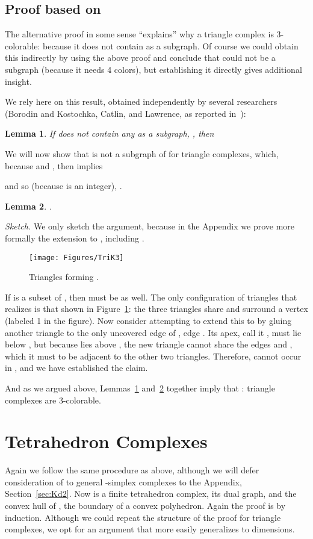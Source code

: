 \pdfoutput=1  \documentclass[]{article}
\newcommand{\ABox}{
\raisebox{3pt}{\framebox[6pt]{\rule{6pt}{0pt}}}
}
\newenvironment{proof}{{\bf Proof:}}{\hfill\ABox}
\newtheorem{lemma}{Lemma}
\newcommand{\lemlab}[1]{\label{lemma:#1}}
\newcommand{\figlab}[1]{\label{fig:#1}}
\newcommand{\lemref}[1]{\ref{lemma:#1}}
\newcommand{\secref}[1]{\ref{sec:#1}}
\newcommand{\figref}[1]{\ref{fig:#1}}
\begin{document}
\subsection{Proof based on }
The alternative proof in some sense ``explains'' why a triangle complex
is
3-colorable: because it does not contain  as a subgraph.
Of course we could obtain this indirectly by using the above proof and
conclude that  could not be a subgraph (because it needs 4
colors),
but establishing it directly gives additional insight.

We rely here on this result,
obtained independently by several researchers
(Borodin and Kostochka, Catlin, and Lawrence, as reported in~\cite{s-nubcn-02}):
\begin{lemma}
If  does not contain any  as a subgraph,
,
then 

\lemlab{Lawrence}
\end{lemma}
We will now show that  is not a subgraph of  for triangle
complexes,
which, because  and , then implies

and so (because  is an integer), .

\begin{lemma}
.
\lemlab{notK4}
\end{lemma}
\begin{proof}
\emph{Sketch.}
We only sketch the argument, because in the Appendix we prove
more formally the extension to , including .

\begin{figure}[htbp]
\centering
\texttt{[image: Figures/TriK3]}
\caption{Triangles forming .}
\figlab{TriK3}
\end{figure}
If  is a subset of , then  must be as well.
The only configuration of triangles that realizes  is that shown
in Figure~\figref{TriK3}: the three triangles share and surround a vertex (labeled
1 in the figure).  Now consider attempting to
extend this to  by gluing another triangle to the only uncovered
edge of , edge .  Its apex, call it
,
must lie below , but because  lies above ,
the new triangle  cannot share the edges
 and , which it must to be adjacent to the other two
triangles.  Therefore,  cannot occur in , and we have established the claim.
\end{proof}

And as we argued above, Lemmas~\lemref{Lawrence} and~\lemref{notK4}
together
imply that : triangle complexes are 3-colorable.

\section{Tetrahedron Complexes}
Again we follow the same procedure as above, although we will defer
consideration of  to general -simplex complexes to the
Appendix, Section~\secref{Kd2}.
Now  is a finite tetrahedron complex,  its dual graph, and 
the convex hull of , the boundary of a convex polyhedron.
Again the proof is by induction.  Although we could repeat the
structure
of the proof for triangle complexes, we opt for an argument that more
easily
generalizes to  dimensions.
\end{document}
